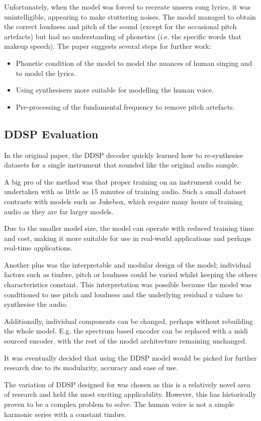 Unfortunately, when the model was forced to recreate unseen sung lyrics, it was unintelligible, appearing to make stuttering noises. The model managed to obtain the correct loudness and pitch of the sound (except for the occasional pitch artefacts) but had no understanding of phonetics (i.e. the specific words that makeup speech). The paper suggests several steps for further work:

\begin{itemize}
    \item Phonetic condition of the model to model the nuances of human singing and to model the lyrics.
    \item Using synthesisers more suitable for modelling the human voice.
    \item Pre-processing of the fundamental frequency to remove pitch artefacts.
\end{itemize}

\subsection{DDSP Evaluation}

In the original paper, the DDSP decoder quickly learned how to re-synthesise datasets for a single instrument that sounded like the original audio sample.

A big pro of the method was that proper training on an instrument could be undertaken with as little as 15 minutes of training audio. Such a small dataset contrasts with models such as Jukebox, which require many hours of training audio as they are far larger models.

Due to the smaller model size, the model can operate with reduced training time and cost, making it more suitable for use in real-world applications and perhaps real-time applications.

Another plus was the interpretable and modular design of the model; individual factors such as timbre, pitch or loudness could be varied whilst keeping the others characteristics constant. This interpretation was possible because the model was conditioned to use pitch and loudness and the underlying residual z values to synthesise the audio.

Additionally, individual components can be changed, perhaps without rebuilding the whole model. E.g. the spectrum based encoder can be replaced with a midi sourced encoder, with the rest of the model architecture remaining unchanged.

It was eventually decided that using the DDSP model would be picked for further research due to its modularity, accuracy and ease of use.

The variation of DDSP designed for  was chosen as this is a relatively novel area of research and held the most exciting applicability. However, this has historically proven to be a complex problem to solve. The human voice is not a simple harmonic series with a constant timbre.